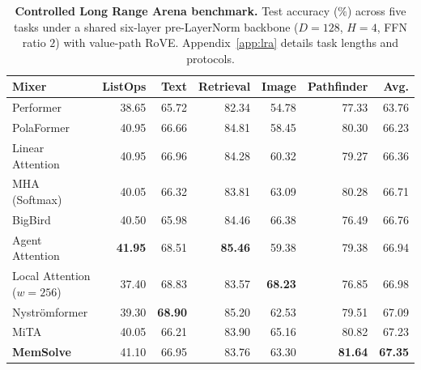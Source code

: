 \documentclass[10pt,twocolumn]{article}
\let\draftsmall\small
\renewcommand{\small}{\draftsmall\fontsize{9}{10}\selectfont}
\begin{document}
\begin{table}[t]
\centering
\captionsetup{width=.84\textwidth}
\caption{\textbf{Controlled Long Range Arena benchmark.}
Test accuracy ($\%$) across five tasks under a shared six-layer pre-LayerNorm
backbone ($D=128$, $H=4$, FFN ratio $2$) with value-path RoVE.
Appendix~\ref{app:lra} details task lengths and protocols.}
\label{tab:lra}
\setlength{\tabcolsep}{8.5pt}
\renewcommand{\arraystretch}{1.03}
\small
\begin{tabular}{lrrrrrr}
\toprule
Mixer & ListOps & Text & Retrieval & Image & Pathfinder & Avg.\\
\midrule
Performer \cite{choromanski2021performer} & 38.65 & 65.72 & 82.34 & 54.78 & 77.33 & 63.76\\
PolaFormer \cite{meng2025polaformer} & 40.95 & 66.66 & 84.81 & 58.45 & 80.30 & 66.23\\
Linear Attention \cite{katharopoulos2020linear} & 40.95 & 66.96 & 84.28 & 60.32 & 79.27 & 66.36\\
MHA (Softmax) \cite{vaswani2017attention} & 40.05 & 66.32 & 83.81 & 63.09 & 80.28 & 66.71\\
BigBird \cite{zaheer2020bigbird} & 40.50 & 65.98 & 84.46 & 66.38 & 76.49 & 66.76\\
Agent Attention \cite{han2024agent} & \textbf{41.95} & 68.51 & \textbf{85.46} & 59.38 & 79.38 & 66.94\\
Local Attention ($w=256$) \cite{beltagy2020longformer} & 37.40 & 68.83 & 83.57 & \textbf{68.23} & 76.85 & 66.98\\
Nystr\"omformer \cite{xiong2021nystrom} & 39.30 & \textbf{68.90} & 85.20 & 62.53 & 79.51 & 67.09\\
MiTA \cite{wen2026mita} & 40.05 & 66.21 & 83.90 & 65.16 & 80.82 & 67.23\\
\midrule
\rowcolor{ResultYellow}
\textbf{MemSolve} & 41.10 & 66.95 & 83.76 & 63.30 & \textbf{81.64} & \textbf{67.35}\\
\bottomrule
\end{tabular}
\end{table}
\end{document}
